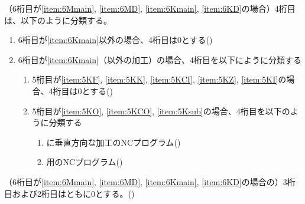 （6桁目が\ref{item:6Mmain}, \ref{item:6MD}, \ref{item:6Kmain}, \ref{item:6KD}の場合）4桁目は、以下のように分類する。
\begin{enumerate}[label=\alph*), ref=\alph*)]
\item 6桁目が\ref{item:6Kmain}\hx 以外の場合、4桁目は0とする({})
\item 6桁目が\ref{item:6Kmain}（\Dimple 以外の加工）の場合、4桁目を以下にように分類する
  \begin{enumerate}[label=\alph{enumi}\,-\arabic*), leftmargin=\leftmargini]
  \item 5桁目が\ref{item:5KF}, \ref{item:5KK}, \ref{item:5KCI}, \ref{item:5KZ}, \ref{item:5KI}\hx の場合、4桁目は0とする({})
  \item 5桁目が\ref{item:5KO}, \ref{item:5KCO}, \ref{item:5Ksub}\hx の場合、4桁目を以下のように分類する
    \begin{enumerate}[label=\arabic*., ref=\arabic*, start=0, leftmargin=*]
    \item \EndFace に垂直方向な加工のNCプログラム({})
    \item \CurvedOutcut 用のNCプログラム({})
    \end{enumerate}
  \end{enumerate}
\end{enumerate}



（6桁目が\ref{item:6Mmain}, \ref{item:6MD}, \ref{item:6Kmain}, \ref{item:6KD}\hx の場合の）3桁目および2桁目はともに0とする。({})


